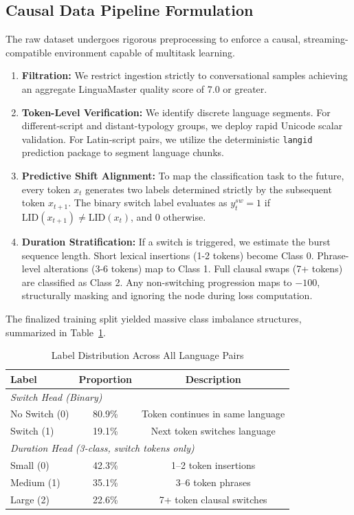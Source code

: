 \documentclass[sigconf,nonacm]{acmart}
\begin{document}
\subsection{Causal Data Pipeline Formulation}
The raw dataset undergoes rigorous preprocessing to enforce a causal, streaming-compatible environment capable of multitask learning.

\begin{enumerate}
    \item \textbf{Filtration:} We restrict ingestion strictly to conversational samples achieving an aggregate LinguaMaster quality score of 7.0 or greater.
    \item \textbf{Token-Level Verification:} We identify discrete language segments. For different-script and distant-typology groups, we deploy rapid Unicode scalar validation. For Latin-script pairs, we utilize the deterministic \texttt{langid} prediction package to segment language chunks.
    \item \textbf{Predictive Shift Alignment:} To map the classification task to the future, every token \(x_t\) generates two labels determined strictly by the subsequent token \(x_{t+1}\). The binary switch label evaluates as \(y^{sw}_t = 1\) if \(\text{LID}(x_{t+1}) \neq \text{LID}(x_t)\), and 0 otherwise. 
    \item \textbf{Duration Stratification:} If a switch is triggered, we estimate the burst sequence length. Short lexical insertions (1-2 tokens) become Class 0. Phrase-level alterations (3-6 tokens) map to Class 1. Full clausal swaps (7+ tokens) are classified as Class 2. Any non-switching progression maps to \(-100\), structurally masking and ignoring the node during loss computation.
\end{enumerate}

The finalized training split yielded massive class imbalance structures, summarized in Table~\ref{tab:classdist}.

\begin{table}[h]
\centering
\caption{Label Distribution Across All Language Pairs}
\label{tab:classdist}
\begin{tabular}{lcc}
\toprule
\textbf{Label} & \textbf{Proportion} & \textbf{Description} \\
\midrule
\multicolumn{3}{l}{\textit{Switch Head (Binary)}} \\
No Switch (0) & 80.9\% & Token continues in same language \\
Switch (1) & 19.1\% & Next token switches language \\
\midrule
\multicolumn{3}{l}{\textit{Duration Head (3-class, switch tokens only)}} \\
Small (0) & 42.3\% & 1--2 token insertions \\
Medium (1) & 35.1\% & 3--6 token phrases \\
Large (2) & 22.6\% & 7+ token clausal switches \\
\bottomrule
\end{tabular}
\end{table}
\end{document}
